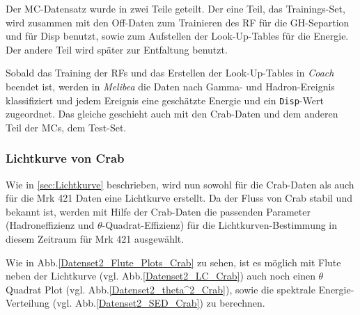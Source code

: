 Der MC-Datensatz wurde in zwei Teile geteilt.
Der eine Teil, das Trainings-Set, wird zusammen mit den Off-Daten zum Trainieren des RF für die GH-Separtion und für Disp benutzt, sowie zum Aufstellen der Look-Up-Tables für die Energie.
Der andere Teil wird später zur Entfaltung benutzt.

Sobald das Training der RFs und das Erstellen der Look-Up-Tables in \textit{Coach} beendet ist, werden in \textit{Melibea} die Daten nach Gamma- und Hadron-Ereignis klassifiziert und jedem Ereignis eine geschätzte Energie und ein \texttt{Disp}-Wert zugeordnet.
Das gleiche geschieht auch mit den Crab-Daten und dem anderen Teil der MCs, dem Test-Set.


\subsubsection{Lichtkurve von Crab}
Wie in \autoref{sec:Lichtkurve} beschrieben, wird nun sowohl für die Crab-Daten als auch für die Mrk 421 Daten eine Lichtkurve erstellt.
Da der Fluss von Crab stabil und bekannt ist, werden mit Hilfe der Crab-Daten die passenden Parameter (Hadroneffizienz und $\theta$-Quadrat-Effizienz) für die Lichtkurven-Bestimmung in diesem Zeitraum für Mrk 421 ausgewählt.

Wie in Abb.\ref{Datenset2_Flute_Plots_Crab} zu sehen, ist es möglich mit Flute neben der Lichtkurve (vgl. Abb.\ref{Datenset2_LC_Crab}) auch noch einen $\theta$ Quadrat Plot (vgl. Abb.\ref{Datenset2_theta^2_Crab}), sowie die spektrale Energie-Verteilung (vgl. Abb.\ref{Datenset2_SED_Crab}) zu berechnen.

